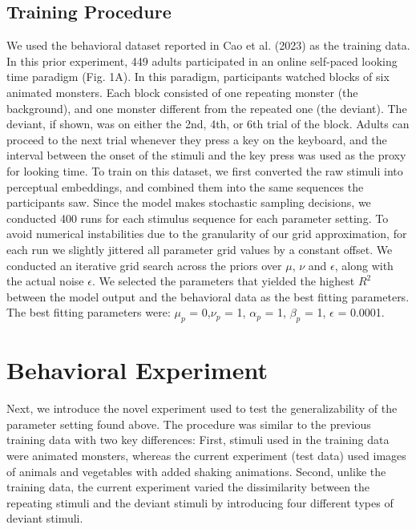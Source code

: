 \documentclass[10pt, letterpaper]{article}
\begin{document}
\hypertarget{training-procedure}{%
\subsection{Training Procedure}\label{training-procedure}}

We used the behavioral dataset reported in Cao et al. (2023) as the
training data. In this prior experiment, 449 adults participated in an
online self-paced looking time paradigm (Fig. 1A). In this paradigm,
participants watched blocks of six animated monsters. Each block
consisted of one repeating monster (the background), and one monster
different from the repeated one (the deviant). The deviant, if shown,
was on either the 2nd, 4th, or 6th trial of the block. Adults can
proceed to the next trial whenever they press a key on the keyboard, and
the interval between the onset of the stimuli and the key press was used
as the proxy for looking time. To train on this dataset, we first
converted the raw stimuli into perceptual embeddings, and combined them
into the same sequences the participants saw. Since the model makes
stochastic sampling decisions, we conducted 400 runs for each stimulus
sequence for each parameter setting. To avoid numerical instabilities
due to the granularity of our grid approximation, for each run we
slightly jittered all parameter grid values by a constant offset. We
conducted an iterative grid search across the priors over \(\mu\),
\(\nu\) and \(\epsilon\), along with the actual noise \(\epsilon\). We
selected the parameters that yielded the highest \(R^2\) between the
model output and the behavioral data as the best fitting parameters. The
best fitting parameters were: \(\mu_{p}\) = 0,\(\nu_{p}\) = 1,
\(\alpha_{p}\) = 1, \(\beta_{p}\) = 1, \(\epsilon\) = 0.0001.

\hypertarget{behavioral-experiment}{%
\section{Behavioral Experiment}\label{behavioral-experiment}}

Next, we introduce the novel experiment used to test the
generalizability of the parameter setting found above. The procedure was
similar to the previous training data with two key differences: First,
stimuli used in the training data were animated monsters, whereas the
current experiment (test data) used images of animals and vegetables
with added shaking animations. Second, unlike the training data, the
current experiment varied the dissimilarity between the repeating
stimuli and the deviant stimuli by introducing four different types of
deviant stimuli.
\end{document}
